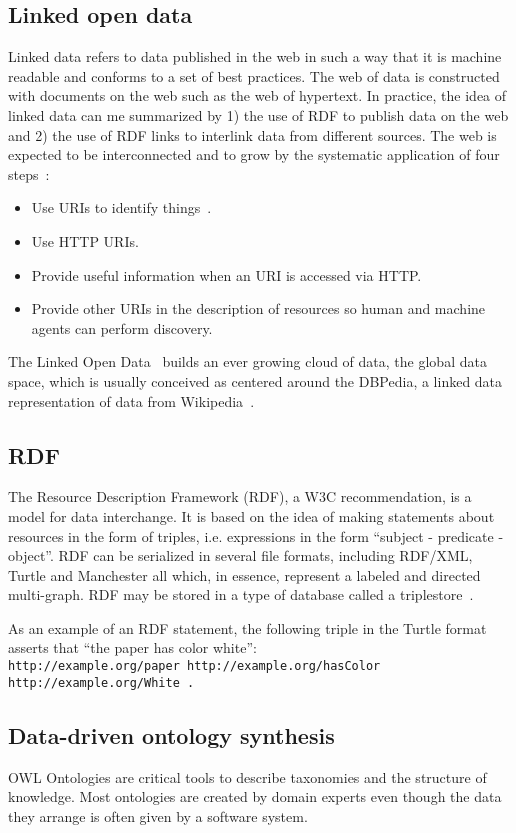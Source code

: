 \documentclass[review]{elsarticle}
\begin{document}
\subsection{Linked open data}
Linked data refers to data published in the web in such a way that it is
machine readable and conforms to a set of best practices.
The web of data is constructed with documents on the web 
such as the web of hypertext.
In practice, the idea of linked data can me summarized
by 1) the use of RDF to publish data on the web and 2) the use of RDF
links to interlink data from different sources.
The web is expected to be interconnected and to grow by the systematic application of four
steps~\cite{lee1}:
\begin{itemize}
    \item Use URIs to identify things~\cite{uri}.
    \item Use HTTP URIs.
    \item Provide useful information when an URI is accessed via HTTP.
    \item Provide other URIs in the description of resources so human
        and machine agents can perform discovery.
\end{itemize}

The Linked Open Data~\cite{lod} builds an ever growing cloud of data,
the global data space, which is usually
conceived as centered around the DBPedia, a linked data representation
of data from Wikipedia~\cite{dbpedia0,dbpedia}.

\subsection{RDF}
The Resource Description Framework (RDF), a W3C
recommendation, is a model for data
interchange.
It is based on the idea of making statements about resources in the form
of triples, i.e. expressions in the form ``subject - predicate -
object''.
RDF can be serialized in several file formats, including RDF/XML,
Turtle and Manchester all which, in essence, represent a labeled and
directed multi-graph.
RDF may be stored in a type of database called a triplestore~\cite{rdf}.

As an example of an RDF statement, the following triple in the Turtle
format asserts that ``the paper has color white'':\\
\texttt{http://example.org/paper http://example.org/hasColor\\
http://example.org/White .}

\subsection{Data-driven ontology synthesis}
OWL Ontologies are critical tools to describe taxonomies and the
structure of knowledge.
Most ontologies are created by domain experts even though the data they
arrange is often given by a software system.  
\end{document}
